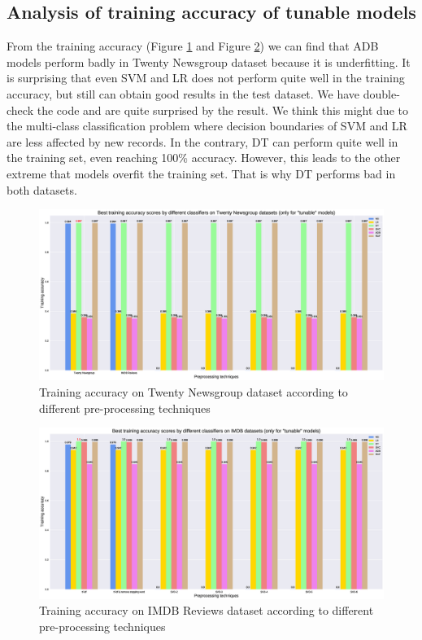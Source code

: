\documentclass[11pt]{scrartcl}
\begin{document}
\subsection*{Analysis of training accuracy of tunable models}
From the training accuracy (Figure \ref{train_accuracy_20} and Figure \ref{train_accuracy_imdb}) we can find that ADB models perform badly in Twenty Newsgroup dataset because it is underfitting. It is surprising that even SVM and LR does not perform quite well in the training accuracy, but still can obtain good results in the test dataset. We have double-check the code and are quite surprised by the result. We think this might due to the multi-class classification problem where decision boundaries of SVM and LR are less affected by new records. In the contrary, DT can perform quite well in the training set, even reaching 100\% accuracy. However, this leads to the other extreme that models overfit the training set. That is why DT performs bad in both datasets.

\begin{figure}[H]
	\centering
	\includegraphics[width=0.9\linewidth]{fig/model_acc_train_20.eps}
	\caption{Training accuracy on Twenty Newsgroup dataset according to different pre-processing techniques}
	\label{train_accuracy_20}
\end{figure}

\begin{figure}[H]
	\centering
	\includegraphics[width=0.9\linewidth]{fig/model_acc_train_imdb.eps}
	\caption{Training accuracy on IMDB Reviews dataset according to different pre-processing techniques}
	\label{train_accuracy_imdb}
\end{figure}
\end{document}
